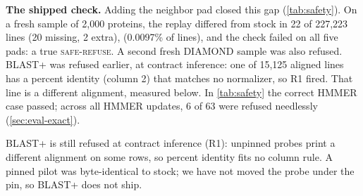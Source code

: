 \documentclass[letterpaper,twocolumn,10pt]{article}
\theoremstyle{definition}
\newcommand{\dec}[1]{\textsc{#1}}
\begin{document}
\textbf{The shipped check.} Adding the neighbor pad closed this gap (\cref{tab:safety}). On a fresh sample of 2{,}000
proteins, the replay differed from stock in 22 of 227{,}223 lines (20 missing, 2 extra), (0.0097\% of lines), and the check failed on all five pads: a true \dec{safe-refuse}. A second fresh DIAMOND sample was also refused. BLAST+ was refused earlier, at contract
inference: one of 15{,}125 aligned lines has a percent identity (column 2) that matches no normalizer, so R1 fired. That line is a different alignment, measured below. In \cref{tab:safety} the correct HMMER case passed; across all
HMMER updates, 6 of 63 were refused needlessly (\cref{sec:eval-exact}).

BLAST+ is still refused at contract inference (R1): unpinned probes print a different alignment on some rows, so percent
identity fits no column rule. A pinned pilot was byte\nobreakdash-identical to stock; we have not moved the probe under the pin, so
BLAST+ does not ship.
\end{document}

